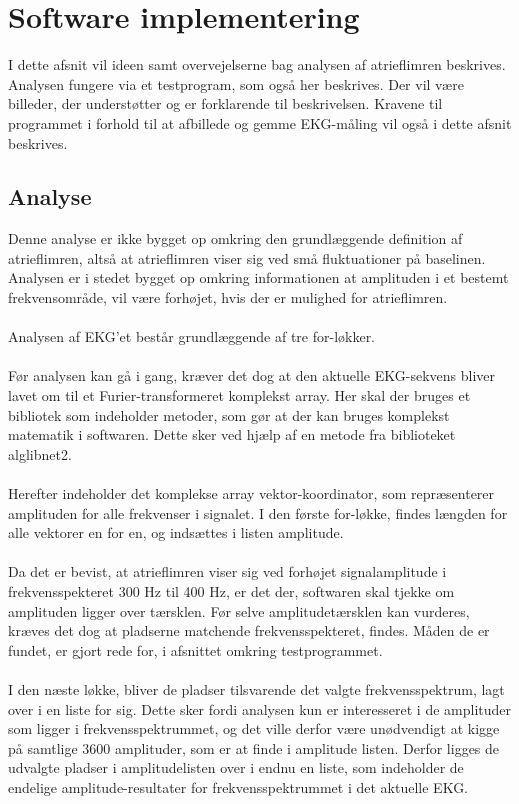 \section{Software implementering}
I dette afsnit vil ideen samt overvejelserne bag analysen af atrieflimren beskrives. Analysen fungere via et testprogram, som også her beskrives. Der vil være billeder, der understøtter og er forklarende til beskrivelsen. Kravene til programmet i forhold til at afbillede og gemme EKG-måling vil også i dette afsnit beskrives. 

\subsection{Analyse}
Denne analyse er ikke bygget op omkring den grundlæggende definition af atrieflimren, altså at atrieflimren viser sig ved små fluktuationer på baselinen. Analysen er i stedet bygget op omkring informationen at amplituden i et bestemt frekvensområde, vil være forhøjet, hvis der er mulighed for atrieflimren. \\ \\
Analysen af EKG’et består grundlæggende af tre for-løkker. \\ \\
Før analysen kan gå i gang, kræver det dog at den aktuelle EKG-sekvens bliver lavet om til et Furier-transformeret komplekst array. Her skal der bruges et bibliotek som indeholder metoder, som gør at der kan bruges komplekst matematik i softwaren. Dette sker ved hjælp af en metode fra biblioteket alglibnet2. \\ \\
Herefter indeholder det komplekse array vektor-koordinator, som repræsenterer amplituden for alle frekvenser i signalet. I den første for-løkke, findes længden for alle vektorer en for en, og indsættes i listen amplitude. \\ \\
Da det er bevist, at atrieflimren viser sig ved forhøjet signalamplitude i frekvensspekteret 300 Hz til 400 Hz, er det der, softwaren skal tjekke om amplituden ligger over tærsklen. Før selve amplitudetærsklen kan vurderes, kræves det dog at pladserne matchende frekvensspekteret, findes. Måden de er fundet, er gjort rede for, i afsnittet omkring testprogrammet. \\ \\
I den næste løkke, bliver de pladser tilsvarende det valgte frekvensspektrum, lagt over i en liste for sig. Dette sker fordi analysen kun er interesseret i de amplituder som ligger i frekvensspektrummet, og det ville derfor være unødvendigt at kigge på samtlige 3600 amplituder, som er at finde i amplitude listen. Derfor ligges de udvalgte pladser i amplitudelisten over i endnu en liste, som indeholder de endelige amplitude-resultater for frekvensspektrummet i det aktuelle EKG. \\ \\
